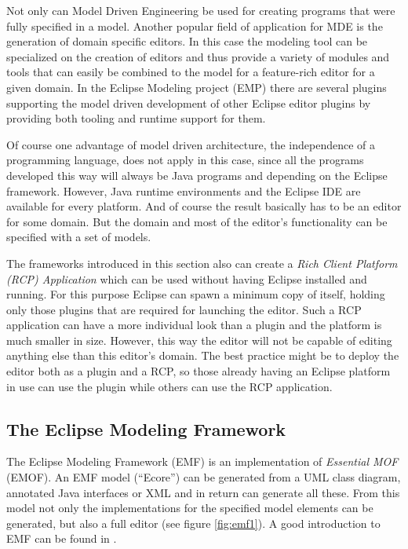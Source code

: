 Not only can Model Driven Engineering be used for creating programs that were fully specified in a model. Another popular field of application for MDE is the generation of domain specific editors. In this case the modeling tool can be specialized on the creation of editors and thus provide a variety of modules and tools that can easily be combined to the model for a feature-rich editor for a given domain. In the Eclipse Modeling project (EMP) \cite{EMP} there are several plugins supporting the model driven development of other Eclipse editor plugins by providing both tooling and runtime support for them.

Of course one advantage of model driven architecture, the independence of a programming language, does not apply in this case, since all the programs developed this way will always be Java programs and depending on the Eclipse framework. However, Java runtime environments and the Eclipse IDE are available for every platform. And of course the result basically has to be an editor for some domain. But the domain and most of the editor's functionality can be specified with a set of models.

The frameworks introduced in this section also can create a \emph{Rich Client Platform (RCP) Application} which can be used without having Eclipse installed and running. For this purpose Eclipse can spawn a minimum copy of itself, holding only those plugins that are required for launching the editor. Such a RCP application can have a more individual look than a plugin and the platform is much smaller in size. However, this way the editor will not be capable of editing anything else than this editor's domain. The best practice might be to deploy the editor both as a plugin and a RCP, so those already having an Eclipse platform in use can use the plugin while others can use the RCP application.


\subsection{The Eclipse Modeling Framework}

The Eclipse Modeling Framework (EMF) \cite{EMF} is an implementation of \emph{Essential MOF} (EMOF). An EMF model (``Ecore'') can be generated from a UML class diagram, annotated Java interfaces or XML and in return can generate all these. From this model not only the implementations for the specified model elements can be generated, but also a full editor (see figure \ref{fig:emf1}). A good introduction to EMF can be found in \cite{emfbook}.

